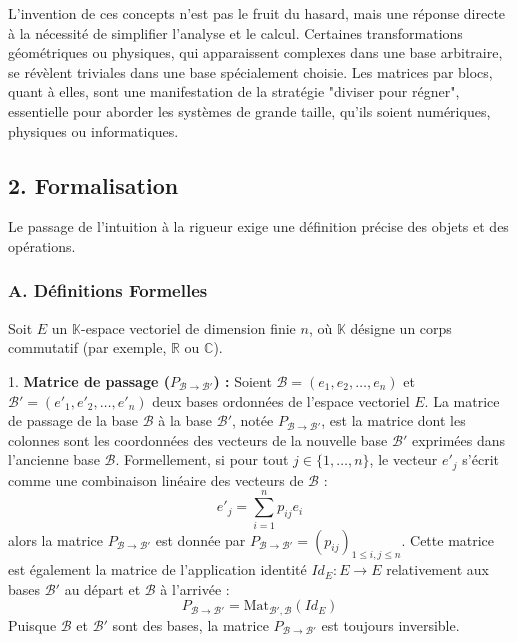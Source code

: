 \documentclass{report}
\begin{document}
L'invention de ces concepts n'est pas le fruit du hasard, mais une réponse directe à la nécessité de simplifier l'analyse et le calcul. Certaines transformations géométriques ou physiques, qui apparaissent complexes dans une base arbitraire, se révèlent triviales dans une base spécialement choisie. Les matrices par blocs, quant à elles, sont une manifestation de la stratégie "diviser pour régner", essentielle pour aborder les systèmes de grande taille, qu'ils soient numériques, physiques ou informatiques.

\subsection*{2. Formalisation}

Le passage de l'intuition à la rigueur exige une définition précise des objets et des opérations.

\subsubsection*{A. Définitions Formelles}

Soit $E$ un $\mathbb{K}$-espace vectoriel de dimension finie $n$, où $\mathbb{K}$ désigne un corps commutatif (par exemple, $\mathbb{R}$ ou $\mathbb{C}$).

1.  \textbf{Matrice de passage ($P_{\mathcal{B} \to \mathcal{B}'}$) :}
    Soient $\mathcal{B} = (e_1, e_2, \dots, e_n)$ et $\mathcal{B}' = (e'_1, e'_2, \dots, e'_n)$ deux bases ordonnées de l'espace vectoriel $E$.
    La matrice de passage de la base $\mathcal{B}$ à la base $\mathcal{B}'$, notée $P_{\mathcal{B} \to \mathcal{B}'}$, est la matrice dont les colonnes sont les coordonnées des vecteurs de la nouvelle base $\mathcal{B}'$ exprimées dans l'ancienne base $\mathcal{B}$.
    Formellement, si pour tout $j \in \{1, \dots, n\}$, le vecteur $e'_j$ s'écrit comme une combinaison linéaire des vecteurs de $\mathcal{B}$ :
    $$e'_j = \sum_{i=1}^{n} p_{ij} e_i$$
    alors la matrice $P_{\mathcal{B} \to \mathcal{B}'}$ est donnée par $P_{\mathcal{B} \to \mathcal{B}'} = (p_{ij})_{1 \le i,j \le n}$.
    Cette matrice est également la matrice de l'application identité $Id_E: E \to E$ relativement aux bases $\mathcal{B}'$ au départ et $\mathcal{B}$ à l'arrivée :
    $$P_{\mathcal{B} \to \mathcal{B}'} = \text{Mat}_{\mathcal{B}', \mathcal{B}}(Id_E)$$
    Puisque $\mathcal{B}$ et $\mathcal{B}'$ sont des bases, la matrice $P_{\mathcal{B} \to \mathcal{B}'}$ est toujours inversible.
\end{document}
